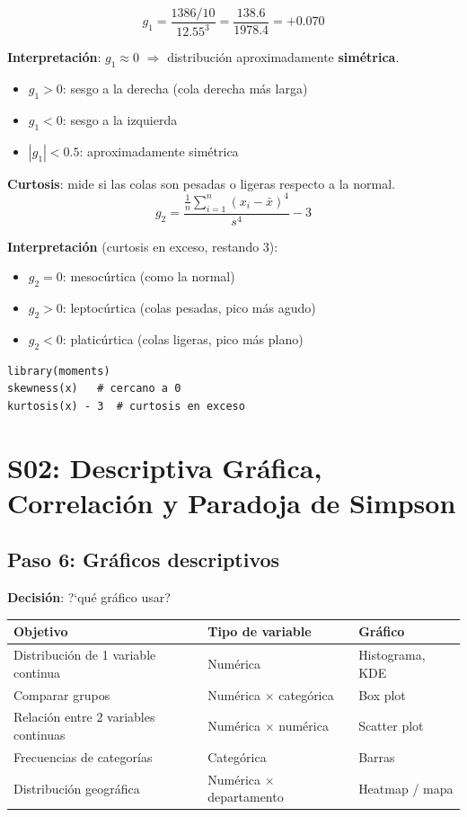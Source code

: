 \documentclass[11pt, a4paper]{article}
\begin{document}
\[
g_1 = \frac{1386 / 10}{12.55^3} = \frac{138.6}{1978.4} = \boxed{+0.070}
\]

\textbf{Interpretaci\'on}: $g_1 \approx 0$ $\Rightarrow$ distribuci\'on aproximadamente \textbf{sim\'etrica}.
\begin{itemize}
  \item $g_1 > 0$: sesgo a la derecha (cola derecha m\'as larga)
  \item $g_1 < 0$: sesgo a la izquierda
  \item $|g_1| < 0.5$: aproximadamente sim\'etrica
\end{itemize}

\textbf{Curtosis}: mide si las colas son pesadas o ligeras respecto a la normal.
\[
g_2 = \frac{\frac{1}{n}\sum_{i=1}^{n}(x_i - \bar{x})^4}{s^4} - 3
\]

\textbf{Interpretaci\'on} (curtosis en exceso, restando 3):
\begin{itemize}
  \item $g_2 = 0$: mesoc\'urtica (como la normal)
  \item $g_2 > 0$: leptoc\'urtica (colas pesadas, pico m\'as agudo)
  \item $g_2 < 0$: platic\'urtica (colas ligeras, pico m\'as plano)
\end{itemize}

\begin{lstlisting}
library(moments)
skewness(x)   # cercano a 0
kurtosis(x) - 3  # curtosis en exceso
\end{lstlisting}

\section{S02: Descriptiva Gr\'afica, Correlaci\'on y Paradoja de Simpson}

\subsection{Paso 6: Gr\'aficos descriptivos}

\textbf{Decisi\'on}: ?`qu\'e gr\'afico usar?

\begin{center}
\begin{tabular}{lll}
\toprule
\textbf{Objetivo} & \textbf{Tipo de variable} & \textbf{Gr\'afico} \\
\midrule
Distribuci\'on de 1 variable continua & Num\'erica & Histograma, KDE \\
Comparar grupos & Num\'erica $\times$ categ\'orica & Box plot \\
Relaci\'on entre 2 variables continuas & Num\'erica $\times$ num\'erica & Scatter plot \\
Frecuencias de categor\'ias & Categ\'orica & Barras \\
Distribuci\'on geogr\'afica & Num\'erica $\times$ departamento & Heatmap / mapa \\
\bottomrule
\end{tabular}
\end{center}
\end{document}
